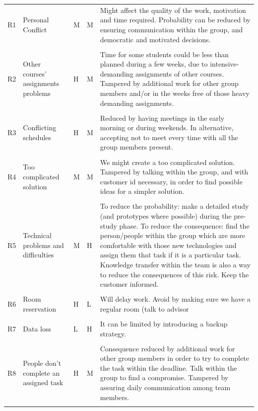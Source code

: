 \documentclass[11pt,a4paper,titlepage,oneside]{report}
\begin{document}
\begin{longtable}{p{0.7cm} p{2.5cm} p{0.7cm} p{0.7cm} p{7cm} }
  \hline
R1 & Personal Conflict & M & M & Might affect the quality of the work, motivation and time required. Probability can be reduced by ensuring communication within the group, and democratic and motivated decisions. \\ \\ \hline
R2 & Other courses’ assignments problems & H & M & Time for some students could be less than planned during a few weeks, due to intensive-demanding assignments of other courses. Tampered by additional work for other group members and/or in the weeks free of those heavy demanding assignments. \\ \\ \hline
R3 & Conflicting schedules & H & M & Reduced by having meetings in the early morning or during weekends. In alternative, accepting not to meet every time with all the group members present. \\ \\ \hline
R4 & Too complicated solution & M & M & We might create a too complicated solution. Tampered by talking within the group, and with customer id necessary, in order to find possible ideas for a simpler solution. \\ \\ \hline
R5 & Technical problems and difficulties & M & H & To reduce the probability: make a detailed study (and prototypes where possible) during the pre-study phase. To reduce the consequence: find the person/people within the group which are more comfortable with those new technologies and assign them that task if it is a particular task. Knowledge transfer within the team is also a way to reduce the consequences of this risk. Keep the customer informed. \\ \\ \hline
R6 & Room reservation & H & L & Will delay work. Avoid by making sure we have a regular room (talk to advisor \\ \\ \hline
R7 & Data loss & L & H & It can be limited by introducing a backup strategy. \\ \\ \hline
R8 & People don’t complete an assigned task & H & M & Consequence reduced by additional work for other group members in order to try to complete the task within the deadline. Talk within the group to find a compromise. Tampered by assuring daily communication among team members. \\ \\ \hline

\end{longtable}
\end{document}
